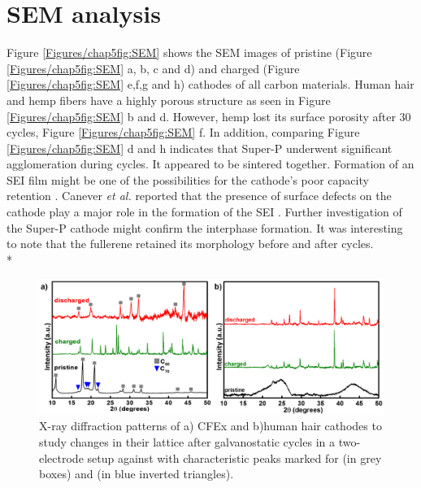 \section*{SEM analysis}
Figure \ref{Figures/chap5fig:SEM} shows the SEM images of pristine (Figure \ref{Figures/chap5fig:SEM} a, b, c and d) and charged (Figure \ref{Figures/chap5fig:SEM} e,f,g and h) cathodes of all carbon materials. Human hair and hemp fibers have a highly porous structure as seen in Figure \ref{Figures/chap5fig:SEM} b and d. However, hemp lost its surface porosity after 30 cycles, Figure \ref{Figures/chap5fig:SEM} f. In addition, comparing Figure \ref{Figures/chap5fig:SEM} d and h indicates that Super-P underwent significant agglomeration during cycles. It appeared to be sintered together. Formation of an SEI film might be one of the possibilities for the cathode's poor capacity retention \cite{}. Canever \textit{et al.} reported that the presence of surface defects on the cathode play a major role in the formation of the SEI \cite{}. Further investigation of the Super-P cathode might confirm the interphase formation. It was interesting to note that the fullerene retained its morphology before and after cycles.\\*

\begin{figure}[h!]
  \centering
  \includegraphics[width=\textwidth]{Figures/chap5fig/XRD}
    \caption{X-ray diffraction patterns of a) CFEx and b)human hair cathodes to study changes in their lattice after galvanostatic cycles in a two-electrode setup against  with characteristic peaks marked for  (in grey boxes) and  (in blue inverted triangles).}
  \label{Figures/chap5fig:XRD}
\end{figure}

